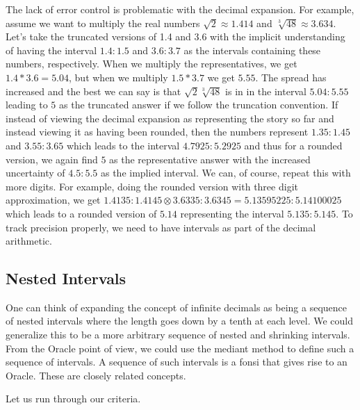 \documentclass[12pt]{article}
\begin{document}
The lack of error control is problematic with the decimal expansion. For example, assume we want to multiply the real numbers $\sqrt{2} \approx 1.414$ and $\sqrt[3]{48}\approx 3.634$. Let's take the truncated versions of 1.4 and 3.6 with the implicit understanding of having the interval $1.4:1.5$ and $3.6:3.7$ as the intervals containing these numbers, respectively. When we multiply the representatives, we get $1.4*3.6 = 5.04$, but when we multiply $1.5*3.7$ we get $5.55$. The spread has increased and the best we can say is that $\sqrt{2} \sqrt[3]{48}$ is in in the interval $5.04:5.55$ leading to $5$ as the truncated answer if we follow the truncation convention. If instead of viewing the decimal expansion as representing the story so far and instead viewing it as having been rounded, then the numbers represent $1.35:1.45$ and $3.55 :3.65$ which leads to the interval $4.7925: 5.2925$ and thus for a rounded version, we again find $5$ as the representative answer with the increased uncertainty of $4.5:5.5$ as the implied interval. We can, of course, repeat this with more digits. For example, doing the rounded version with three digit approximation, we get $1.4135:1.4145\otimes 3.6335:3.6345 = 5.13595225:5.14100025$ which leads to a rounded version of $5.14$ representing the interval $5.135:5.145$. To track precision properly, we need to have intervals as part of the decimal arithmetic. 


\subsection{Nested Intervals}

One can think of expanding the concept of infinite decimals as being a sequence of nested intervals where the length goes down by a tenth at each level. We could generalize this to be a more arbitrary sequence of nested and shrinking intervals. From the Oracle point of view, we could use the mediant method to define such a sequence of intervals. A sequence of such intervals is a fonsi that gives rise to an Oracle. These are closely related concepts. 

Let us run through our criteria. 
\end{document}
